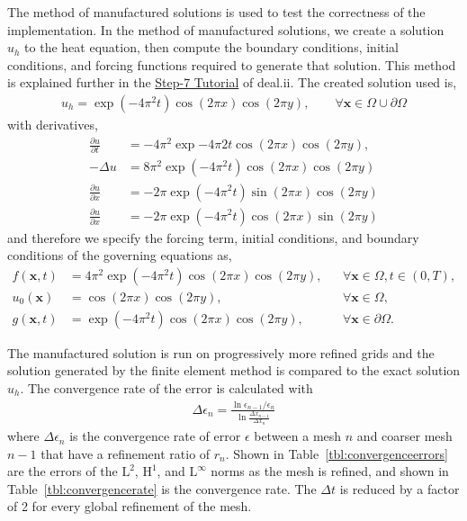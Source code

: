 \documentclass{article}
\begin{document}
The method of manufactured solutions is used to test the correctness of the implementation.
In the method of manufactured solutions, we create a solution \(u_h\) to the heat equation, then compute the boundary conditions, initial conditions, and forcing functions required to generate that solution\cite{BangerthHartmannKanschat2007}.
This method is explained further in the \href{https://dealii.org/developer/doxygen/deal.II/step\_7.html}{Step-7 Tutorial} of deal.ii\cite{BangerthHartmannKanschat2007}.
The created solution used is,
\begin{align}
  u_h = \exp\left( -4\pi^2t \right) \cos(2 \pi x) \cos(2 \pi y), \qquad \forall \boldsymbol{x} \in \Omega \cup \partial\Omega
\end{align}
with derivatives,
\begin{align}
  \frac{\partial u}{\partial t} &= -4 \pi^2 \exp{-4\pi 2t} \cos(2 \pi x)\cos(2 \pi y), \\
  -\Delta u &= 8 \pi^2 \exp\left(-4\pi^2t\right)\cos(2 \pi x)\cos(2 \pi y) \\
  \frac{\partial u}{\partial x} &= -2\pi \exp\left(-4\pi^2t\right)\sin(2\pi x)\cos(2\pi y) \\
 \frac{\partial u}{\partial x} &= -2 \pi \exp\left(-4\pi^2t\right)\cos(2\pi x)\sin(2\pi y)
\end{align}
and therefore we specify the forcing term, initial conditions, and boundary conditions of the governing equations as,
\begin{align}
  f(\boldsymbol{x},t) &= 4 \pi^2 \exp\left(-4\pi^2t\right)\cos(2 \pi x)\cos(2 \pi y), &&\forall\boldsymbol{x}\in\Omega,t\in\left( 0,T \right), \\
  u_0(\boldsymbol{x}) &= \cos(2 \pi x)\cos(2\pi y), &&\forall \boldsymbol{x}\in\Omega, \\
  g(\boldsymbol{x},t) &= \exp\left(-4\pi^2t\right)\cos(2 \pi x)\cos(2\pi y), &&\forall \boldsymbol{x} \in \partial\Omega.
\end{align}

The manufactured solution is run on progressively more refined grids and the solution generated by the finite element method is compared to the exact solution \(u_h\).
The convergence rate of the error is calculated with
\begin{align}
  \Delta \epsilon_n = \frac{\ln{\epsilon_{n-1}/\epsilon_{n}}}{\ln{\frac{\Delta x_{n-1}}{\Delta x_{n}}}}
\end{align}
where \(\Delta \epsilon_n\) is the convergence rate of error \(\epsilon\) between a mesh \(n\) and coarser mesh \(n-1\) that have a refinement ratio of \(r_n\).
Shown in Table~\ref{tbl:convergenceerrors} are the errors of the $\textrm{L}^2$, $\textrm{H}^1$, and $\textrm{L}^\infty$ norms as the mesh is refined, and shown in Table~\ref{tbl:convergencerate} is the convergence rate.
The \(\Delta t\) is reduced by a factor of 2 for every global refinement of the mesh.
\end{document}

